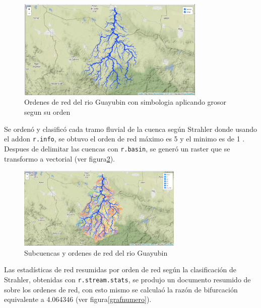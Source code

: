 \documentclass[11pt,]{article}
\begin{document}
\begin{figure}
\centering
\includegraphics[width=0.80000\textwidth]{orden de red mapa 2.png}
\caption{Ordenes de red del rio Guayubin con simbologia aplicando grosor
segun su orden\label{grosor}}
\end{figure}

Se ordenó y clasificó cada tramo fluvial de la cuenca según Strahler
donde usando el addon \texttt{r.info}, se obtuvo el orden de red máximo
es 5 y el minimo es de 1 . Despues de delimitar las cuencas con
\texttt{r.basin}, se generó un raster que se transformo a vectorial (ver
figura\ref{subcuencas}).

\begin{figure}
\centering
\includegraphics[width=0.70000\textwidth]{cuencas delimitadas y ordenes de red.png}
\caption{Subcuencas y ordenes de red del rio Guayubin\label{subcuencas}}
\end{figure}

Las estadísticas de red resumidas por orden de red según la
clasificación de Strahler, obtenidas con \texttt{r.stream.stats}, se
produjo un documento resumido de sobre los ordenes de red, con esto
mismo se calculaó la razón de bifurcación equivalente a 4.064346 (ver
figura\ref {grafnumero}).
\end{document}
